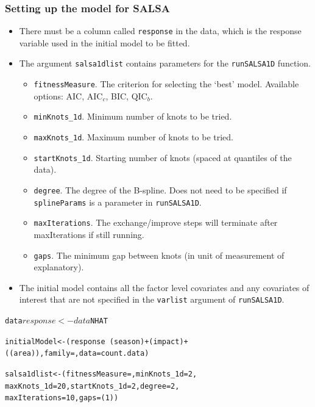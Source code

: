\begin{frame}[fragile]
\frametitle{Setting up the model for SALSA}
\begin{itemize}
\item There must be a column called {\tt response} in the data, which is the response variable used in the initial model to be fitted.
\item The argument {\tt salsa1dlist} contains parameters for the {\tt runSALSA1D} function.  
\begin{itemize}
\item {\tt fitnessMeasure}. The criterion for selecting the `best' model.  Available options: AIC, AIC$_c$, BIC, QIC$_b$.
\item {\tt minKnots\_1d}. Minimum number of knots to be tried.
\item {\tt maxKnots\_1d}. Maximum number of knots to be tried.
\item {\tt startKnots\_1d}. Starting number of knots (spaced at quantiles of the data).
\item {\tt degree}. The degree of the B-spline. Does not need to be specified if {\tt splineParams} is a parameter in {\tt runSALSA1D}.
\item {\tt maxIterations}. The exchange/improve steps will terminate after maxIterations if still running.
\item {\tt gaps}. The minimum gap between knots (in unit of measurement of explanatory).
\end{itemize}
\item The initial model contains all the factor level covariates and any covariates of interest that are not specified in the {\tt varlist} argument of {\tt runSALSA1D}.
\end{itemize}

\begin{knitrout}\footnotesize
{}\color{fgcolor}\begin{kframe}
\begin{alltt}
data$response <- data$NHAT

initialModel <- (response ~ (season) + (impact) + 
    ((area)), family = , data = count.data)

salsa1dlist <- (fitnessMeasure = , minKnots_1d = 2, 
                    maxKnots_1d = 20, startKnots_1d = 2, degree = 2, 
                    maxIterations = 10, gaps = (1))
\end{alltt}
\end{kframe}
\end{knitrout}


\end{frame}
